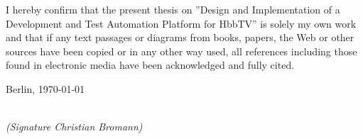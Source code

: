 \newpage

\thispagestyle{empty}

\begin{large}

\vspace*{6cm}

\noindent
I hereby confirm that the present thesis on ''Design and Implementation of a Development and Test Automation Platform for HbbTV'' is solely my own work and that if any text passages or diagrams from books, papers, the Web or other sources have been copied or in any other way used, all references including those found in electronic media have been acknowledged and fully cited.
\vspace{2cm}

\noindent
Berlin, \today

\vspace{3cm}

\hspace*{7cm}%
\dotfill\\
\hspace*{8.5cm}%
\textit{(Signature Christian Bromann)}

\end{large}

